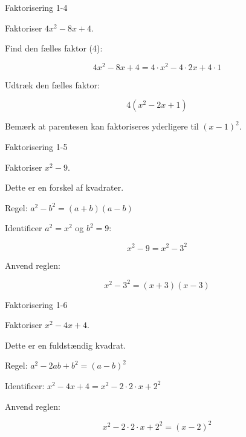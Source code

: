 \documentclass{article}
\begin{document}
\newpage

\begin{exercise}{Faktorisering 1-4}

Faktoriser $4x^2 - 8x + 4$.


\hint

Find den fælles faktor (4):

\hint
\[
4x^2 - 8x + 4 = 4 \cdot x^2 - 4 \cdot 2x + 4 \cdot 1
\]

\hint

Udtræk den fælles faktor:

\hint
\[
4(x^2 - 2x + 1)
\]

\hint

Bemærk at parentesen kan faktoriseres yderligere til $(x-1)^2$.

\end{exercise}

\newpage

\begin{exercise}{Faktorisering 1-5}

Faktoriser $x^2 - 9$.


\hint

Dette er en forskel af kvadrater.

\hint

Regel: $a^2 - b^2 = (a + b)(a - b)$

\hint

Identificer $a^2 = x^2$ og $b^2 = 9$:

\hint
\[
x^2 - 9 = x^2 - 3^2
\]

\hint

Anvend reglen:

\hint
\[
x^2 - 3^2 = (x + 3)(x - 3)
\]

\end{exercise}

\newpage

\begin{exercise}{Faktorisering 1-6}

Faktoriser $x^2 - 4x + 4$.


\hint

Dette er en fuldstændig kvadrat.

\hint

Regel: $a^2 - 2ab + b^2 = (a - b)^2$

\hint

Identificer: $x^2 - 4x + 4 = x^2 - 2 \cdot 2 \cdot x + 2^2$

\hint

Anvend reglen:

\hint
\[
x^2 - 2 \cdot 2 \cdot x + 2^2 = (x - 2)^2
\]

\end{exercise}
\end{document}
